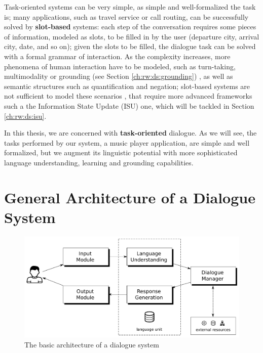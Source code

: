 Task-oriented systems can be very simple, as simple and well-formalized the task is;  many applications, such as travel service or call routing, can be successfully solved by \textbf{slot-based} systems: each step of the conversation requires some pieces of information, modeled as slots, to be filled in by the user (departure city, arrival city, date, and so on); given the slots to be filled, the dialogue task can be solved with a formal grammar of interaction. As the complexity increases, more phenomena of human interaction have to be modeled, such as turn-taking, multimodality or grounding (see Section \ref{ch:rw:ds:grounding})
, as well as semantic structures such as quantification and negation; slot-based systems are not sufficient to model these scenarios \citep{Gabsdil03clarificationin}, that require more advanced frameworks such a the Information State Update (ISU) one, which will be tackled in Section \ref{ch:rw:ds:isu}.

In this thesis, we are concerned with \textbf{task-oriented} dialogue. As we will see, the tasks performed by our system, a music player application, are simple and well formalized, but we augment its linguistic potential with more sophisticated language understanding, learning and grounding capabilities.


\section{General Architecture of a Dialogue System} \label{ch:introduction:arch}
\begin{figure}
	\centering
	\includegraphics[width=15cm]{Pictures/ds_arch.pdf}
	\caption{The basic architecture of a dialogue system}
	\label{ds_arch}
\end{figure}

